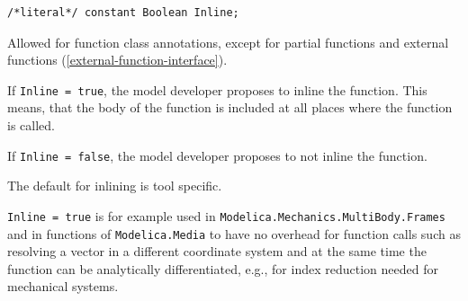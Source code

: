 \begin{annotationdefinition}[Inline]
\begin{synopsis}\begin{lstlisting}
/*literal*/ constant Boolean Inline;
\end{lstlisting}\end{synopsis}
\begin{semantics}
Allowed for function class annotations, except for partial functions and external functions (\cref{external-function-interface}).

If {\lstinline!Inline = true!}, the model developer proposes to inline the function.
This means, that the body of the function is included at all places where the function is called.

If {\lstinline!Inline = false!}, the model developer proposes to not inline the function.

The default for inlining is tool specific.

\begin{nonnormative}
{\lstinline!Inline = true!} is for example used in {\lstinline!Modelica.Mechanics.MultiBody.Frames!} and in functions of {\lstinline!Modelica.Media!} to have no overhead for function calls such as resolving a vector in a different coordinate system and at the same time the function can be analytically differentiated, e.g., for index reduction needed for mechanical systems.
\end{nonnormative}
\end{semantics}
\end{annotationdefinition}

